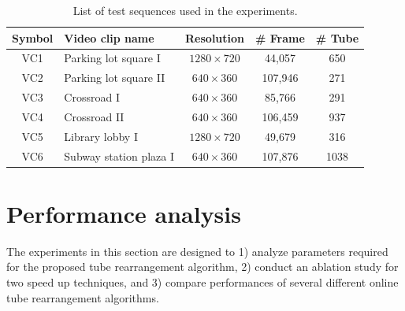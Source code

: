 \documentclass[11pt]{hyu_thesis}
\begin{document}
\begin{table}
	\begin{center}
		\begin{tabular}{clccc}
			\hline
			\hline
			Symbol & Video clip name & Resolution & \# Frame & \# Tube\\
			\hline
			\hline
			VC1 & Parking lot square I & $1280 \times 720$ & 44,057 & 650\\
			\hline
			VC2 & Parking lot square II & $640 \times 360$ & 107,946 & 271\\
			\hline
			VC3 & Crossroad I & $640 \times 360$ & 85,766 & 291\\
			\hline
			VC4 & Crossroad II & $640 \times 360$ & 106,459 & 937\\
			\hline
			VC5 & Library lobby I & $1280 \times 720$ & 49,679 & 316\\
			\hline
			VC6 & Subway station plaza I & $640 \times 360$ & 107,876 & 1038\\
			\hline
		\end{tabular}
	\end{center}
	\caption{List of test sequences used in the experiments.}
	\label{tb:video_perf}
\end{table}

\section{Performance analysis}
The experiments in this section are designed to 1) analyze parameters required for the proposed tube rearrangement algorithm, 2) conduct an ablation study for two speed up techniques, and 3) compare performances of several different online tube rearrangement algorithms.
\end{document}
